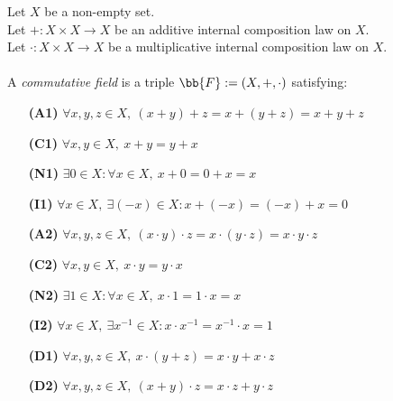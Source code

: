\begin{definition-pre}
    \label{def:commutative_field}
    Let \(X\) be a non-empty set. \\
    Let \(+: X\times X \to X\) be an additive internal composition law on \(X\). \\
    Let \(\cdot: X\times X \to X\) be a multiplicative internal composition law on \(X\). \\\\
    A \textit{commutative field} is a triple \(\bb{F}:= (X, +, \cdot)\) satisfying:
    \begin{enumerate}
        \item [\textbf{(A1)}] \(\forall x,y,z\in X,\ (x+y)+z= x+(y+z) = x+y+z\)
        \item [\textbf{(C1)}] \(\forall x,y\in X,\ x+y = y+x\)
        \item [\textbf{(N1)}] \(\exists 0 \in X : \forall x \in X,\ x+0 = 0+x = x\)
        \item [\textbf{(I1)}] \(\forall x \in X,\ \exists (-x)\in X: x+(-x) = (-x)+x = 0\)
        \item [\textbf{(A2)}] \(\forall x,y,z\in X,\ (x\cdot y)\cdot z= x\cdot(y\cdot z) = x\cdot y\cdot z\)
        \item [\textbf{(C2)}] \(\forall x,y\in X,\ x\cdot y = y\cdot x\)
        \item [\textbf{(N2)}] \(\exists 1 \in X : \forall x \in X,\ x\cdot1 = 1\cdot x = x\)
        \item [\textbf{(I2)}] \(\forall x \in X,\ \exists x^{-1}\in X: x\cdot x^{-1} = x^{-1}\cdot x = 1\)
        \item [\textbf{(D1)}] \(\forall x,y,z \in X,\ x\cdot(y+z)=x\cdot y+x\cdot z\)
        \item [\textbf{(D2)}] \(\forall x,y,z \in X,\ (x+y)\cdot z=x\cdot z+y\cdot z\)
    \end{enumerate}
\end{definition-pre}

\begin{definition-pre}
    \label{def:number_field}
\end{definition-pre}

\begin{definition-pre}
    \label{def:fundamental_system}
\end{definition-pre}

\begin{definition-pre}[Unit]
    \label{def:unit}
\end{definition-pre}
\begin{definition-pre}
    \label{def:primitive_root_of_unity}
\end{definition-pre}

